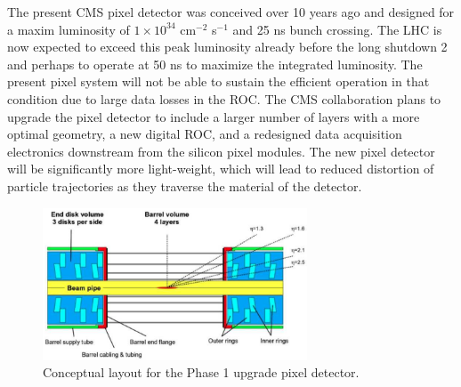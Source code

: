 


The present CMS pixel detector was conceived over 10 years ago and
designed for a maxim luminosity of $1 \times 10^{34}$ cm$^{-2}$
s$^{-1}$ and 25 ns bunch crossing. The LHC is now expected to exceed
this peak luminosity already before the long shutdown 2 and perhaps to
operate at 50 ns to maximize the integrated luminosity. The present
pixel system will not be able to sustain the efficient operation in
that condition due to large data losses in the ROC.
The CMS collaboration plans to upgrade the pixel detector to include a
larger number of layers with a more optimal geometry, a new digital
ROC, and a redesigned data acquisition electronics downstream from the
silicon pixel modules. The new pixel detector will be significantly
more light-weight, which will lead to reduced distortion of particle
trajectories as they traverse the material of the detector. 

\begin{figure}[htb]
  \centering
  \includegraphics[width=0.7\textwidth]{Phase_1_pixel_detector.png}
  \caption{\label{fig:phase1pixels}
    Conceptual layout for the Phase 1 upgrade pixel detector.
  }
\end{figure}


